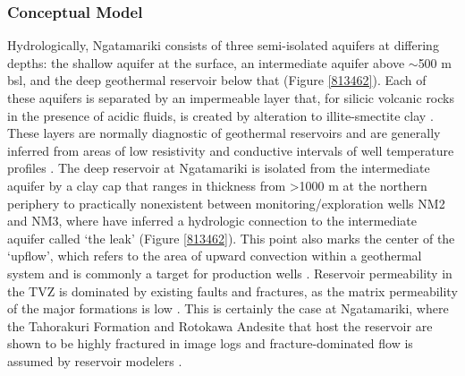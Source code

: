 \subsubsection{Conceptual Model}
Hydrologically, Ngatamariki consists of three semi-isolated aquifers at differing depths: the shallow aquifer at the surface, an intermediate aquifer above $\sim$500 m bsl, and the deep geothermal reservoir below that \citep{Boseley_2010,Chambefort_2016} (Figure \ref{813462}). Each of these aquifers is separated by an impermeable layer that, for silicic volcanic rocks in the presence of acidic fluids, is created by alteration to illite-smectite clay \citep{Boseley_2010}. These layers are normally diagnostic of geothermal reservoirs and are generally inferred from areas of low resistivity \citep[e.g.][]{Bibby_1995} and conductive intervals of well temperature profiles \citep{Grant_2011}. The deep reservoir at Ngatamariki is isolated from the intermediate aquifer by a clay cap that ranges in thickness from \textgreater1000 m at the northern periphery to practically nonexistent between monitoring\slash{exploration} wells NM2 and NM3, where \citet{Boseley_2010} have inferred a hydrologic connection to the intermediate aquifer called `the leak' (Figure \ref{813462}). This point also marks the center of the `upflow', which refers to the area of upward convection within a geothermal system and is commonly a target for production wells \citep{Grant_2011}. Reservoir \gls{permeability} in the \acrshort{TVZ} is dominated by existing faults and fractures, as the matrix \gls{permeability} of the major formations is low \citep{Grant_2011,Cant_2018}. This is certainly the case at Ngatamariki, where the Tahorakuri Formation and Rotokawa Andesite that host the reservoir are shown to be highly fractured in image logs \citep{nm09_report,nm10_report,massiot_2012} and fracture-dominated flow is assumed by reservoir modelers \citep[e.g.][]{Quinao_2018}.

